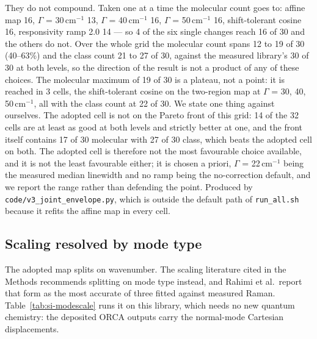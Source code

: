 \documentclass[11pt]{article}
\newcommand*\wn{\ensuremath{\text{cm}^{-1}}}
\begin{document}
\begin{table}[htbp]
\begin{flushleft}\footnotesize They do not compound. Taken one at a time the molecular count goes to: affine map 16, $\Gamma$ = 30\,\wn{} 13, $\Gamma$ = 40\,\wn{} 16, $\Gamma$ = 50\,\wn{} 16, shift-tolerant cosine 16, responsivity ramp 2.0 14 --- so 4 of the six single changes reach 16 of 30 and the others do not. Over the whole grid the molecular count spans 12 to 19 of 30 (40--63\%) and the class count 21 to 27 of 30, against the measured library's 30 of 30 at both levels, so the direction of the result is not a product of any of these choices. The molecular maximum of 19 of 30 is a plateau, not a point: it is reached in 3 cells, the shift-tolerant cosine on the two-region map at $\Gamma$ = 30, 40, 50\,\wn{}, all with the class count at 22 of 30. We state one thing against ourselves. The adopted cell is not on the Pareto front of this grid: 14 of the 32 cells are at least as good at both levels and strictly better at one, and the front itself contains 17 of 30 molecular with 27 of 30 class, which beats the adopted cell on both. The adopted cell is therefore not the most favourable choice available, and it is not the least favourable either; it is chosen a priori, $\Gamma$ = 22\,\wn{} being the measured median linewidth and no ramp being the no-correction default, and we report the range rather than defending the point. Produced by \texttt{code/v3\_joint\_envelope.py}, which is outside the default path of \texttt{run\_all.sh} because it refits the affine map in every cell.\end{flushleft}
\end{table}

\subsection{Scaling resolved by mode type}

The adopted map splits on wavenumber. The scaling literature cited in the Methods
recommends splitting on mode type instead, and Rahimi et al.\ report that form as the
most accurate of three fitted against measured Raman. Table~\ref{tab:si-modescale}
runs it on this library, which needs no new quantum chemistry: the deposited ORCA
outputs carry the normal-mode Cartesian displacements.
\end{document}
